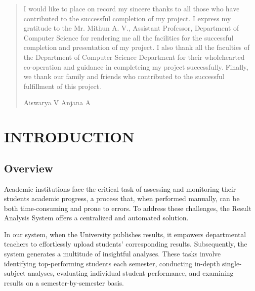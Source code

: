 \documentclass{nascproject}
\begin{document}
\newpage
\renewcommand\abstractname{ACKNOWLEDGMENT}
\begin{abstract}
\vspace{5cm}
I would like to place on record my sincere thanks to all those who have contributed to the successful completion of my project. I express my gratitude to the Mr. Mithun A. V., Assistant Professor, Department of Computer Science for rendering me all the facilities for the successful completion and presentation of my project. I also thank all the faculties of the Department of Computer Science Department for their wholehearted co-operation and guidance in completeing my project successfully. Finally, we thank our family and  friends who contributed to the successful fulfillment of this project.
\vspace{1cm}
\begin{flushright}
Aiswarya V
Anjana A
\end{flushright}
\end{abstract}
\newpage

\restoregeometry
\tableofcontents
\newpage

\cleardoublepage
{}
\listoffigures
\newpage

\cleardoublepage
{}
\listoftables
\newpage
\pagestyle{fancy}


\chapter{INTRODUCTION}
\setcounter{page}{1}
\renewcommand{\baselinestretch}{1.50}
\section{Overview}

Academic institutions face the critical task of assessing and monitoring their students academic progress, a process that, when performed manually, can be both time-consuming and prone to errors. To address these challenges, the Result Analysis System offers a centralized and automated solution.

In our system, when the University publishes results, it empowers departmental teachers to effortlessly upload students' corresponding results. Subsequently, the system generates a multitude of insightful analyses. These tasks involve identifying top-performing students each semester, conducting in-depth single-subject analyses, evaluating individual student performance, and examining results on a semester-by-semester basis.
\end{document}
